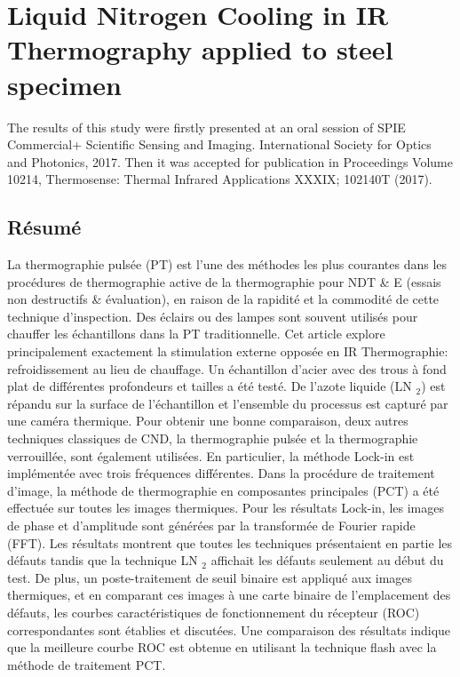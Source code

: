 \chapter{Liquid Nitrogen Cooling in IR Thermography applied to steel specimen}
The results of this study were firstly presented at an oral session of SPIE Commercial+ Scientific Sensing and Imaging. International Society for Optics and Photonics, 2017.
Then it was accepted for publication in Proceedings Volume 10214, Thermosense: Thermal Infrared Applications XXXIX; 102140T (2017).


%
\section*{Résumé}
La thermographie pulsée (PT) est l'une des méthodes les plus courantes dans les procédures de thermographie active de la thermographie pour NDT \& E ​​(essais non destructifs  \& évaluation), en raison de la rapidité et la commodité de cette technique d'inspection. Des éclairs ou des lampes sont souvent utilisés pour chauffer les échantillons dans la PT traditionnelle. Cet article explore principalement exactement la stimulation externe opposée en IR Thermographie: refroidissement au lieu de chauffage. Un échantillon d'acier avec des trous à fond plat de différentes profondeurs et tailles a été testé. De l'azote liquide (LN $_2$) est répandu sur la surface de l'échantillon et l'ensemble du processus est capturé par une caméra thermique. Pour obtenir une bonne comparaison, deux autres techniques classiques de CND, la thermographie pulsée et la thermographie verrouillée, sont également utilisées. En particulier, la méthode Lock-in est implémentée avec trois fréquences différentes. Dans la procédure de traitement d'image, la méthode de thermographie en composantes principales (PCT) a été effectuée sur toutes les images thermiques. Pour les résultats Lock-in, les images de phase et d'amplitude sont générées par la transformée de Fourier rapide (FFT). Les résultats montrent que toutes les techniques présentaient en partie les défauts tandis que la technique LN $_2$ affichait les défauts seulement au début du test. De plus, un poste-traitement de seuil binaire est appliqué aux images thermiques, et en comparant ces images à une carte binaire de l'emplacement des défauts, les courbes caractéristiques de fonctionnement du récepteur (ROC) correspondantes sont établies et discutées. Une comparaison des résultats indique que la meilleure courbe ROC est obtenue en utilisant la technique flash avec la méthode de traitement PCT.

